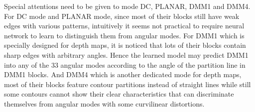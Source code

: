 Special attentions need to be given to
mode DC, PLANAR, DMM1 and DMM4.
For DC mode and PLANAR mode, since most of their blocks
still have weak edges with various patterns, 
intuitively it seems not practical to require 
neural network to learn to 
distinguish them from angular modes.
For DMM1 which is specially designed for depth maps, 
it is noticed that lots of their
blocks contain sharp edges with arbitrary angles.
Hence the learned model may predict DMM1 into any
of the 33 angular modes according to the angle of
the partition line in DMM1 blocks.
And DMM4 which is another dedicated mode for depth maps,
most of their blocks feature contour partitions instead of
straight lines while still some contours cannot show 
their clear characteristics that can discriminate themselves
from angular modes with some curvilinear distortions.

